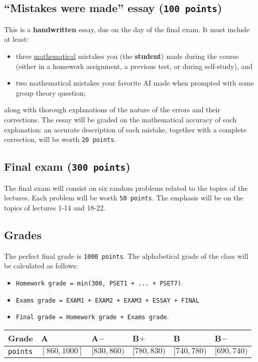 \documentclass[11pt]{article}
\begin{document}
\subsection*{``Mistakes were made'' essay (\texttt{100 points})}
\label{sec:org36bcff4}
This is a \textbf{handwritten} essay, due on the day of the final exam. It must
include at least:
\begin{itemize}
\item three \uline{mathematical} mistakes you (the \textbf{student}) made during the course
(either in a homework assignment, a previous test, or during self-study), and
\item two mathematical mistakes your favorite AI made when prompted with some group
theory question;
\end{itemize}

along with thorough explanations of the nature of the errors and their
corrections. The essay will be graded on the mathematical accuracy of each
explanation: an accurate description of each mistake, together with a complete
correction, will be worth \texttt{20 points}.



\subsection*{Final exam (\texttt{300 points})}
\label{sec:org13eae6a}
The final exam will consist on six random problems related to the topics of the
lectures. Each problem will be worth \texttt{50 points}. The emphasis will be on the
topics of lectures 1-14 and 18-22. 

\subsection*{Grades}
\label{sec:org9fbb415}
The perfect final grade is \texttt{1000 points}. The alphabetical grade of the class
will be calculated as follows:
\begin{itemize}
\item \texttt{Homework grade = min(300, PSET1 + ... + PSET7)}.
\item \texttt{Exams grade = EXAM1 + EXAM2 + EXAM3 + ESSAY + FINAL}
\item \texttt{Final grade = Homework grade + Exams grade}.
\end{itemize}
\begin{center}
\begin{tabular}{l|lllll}
\textbf{Grade} & A & A\(-\) & B\(+\) & B & B\(-\)\\[0pt]
\hline
\texttt{points} & \([860,1000]\) & \([830,860)\) & \([780,830)\) & \([740,780)\) & \([690,740)\)\\[0pt]
\end{tabular}
\end{center}
\end{document}
